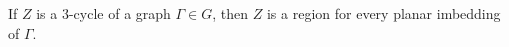 If $Z$ is a 3-cycle of a graph $\Gamma \in G$, then $Z$ is a region for every planar imbedding of $\Gamma$.

